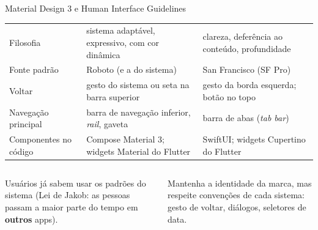 \documentclass[aspectratio=169,10pt]{beamer}
\begin{document}
\begin{frame}{Material Design 3 e Human Interface Guidelines}
  \footnotesize
  \begin{tabularx}{\textwidth}{@{}p{2.6cm} L L@{}}
    \toprule
    &  &  \\
    \midrule
    Filosofia & sistema adaptável, expressivo, com cor dinâmica & clareza, deferência ao conteúdo, profundidade \\
    Fonte padrão & Roboto (e a do sistema) & San Francisco (SF Pro) \\
    Voltar & gesto do sistema ou seta na barra superior & gesto da borda esquerda; botão no topo \\
    Navegação principal & barra de navegação inferior, \emph{rail}, gaveta & barra de abas (\emph{tab bar}) \\
    Componentes no código & Compose Material 3; widgets Material do Flutter & SwiftUI; widgets Cupertino do Flutter \\
    \bottomrule
  \end{tabularx}
  \vspace{4pt}
  \begin{columns}[T]
    \begin{column}{0.48\textwidth}
      \begin{conceito}
        Usuários já sabem usar os padrões do sistema (Lei de Jakob: as pessoas passam a maior parte do tempo em \textbf{outros} apps).
      \end{conceito}
    \end{column}
    \begin{column}{0.48\textwidth}
      \begin{dica}
        Mantenha a identidade da marca, mas respeite convenções de cada sistema: gesto de voltar, diálogos, seletores de data.
      \end{dica}
    \end{column}
  \end{columns}
\end{frame}
\end{document}
